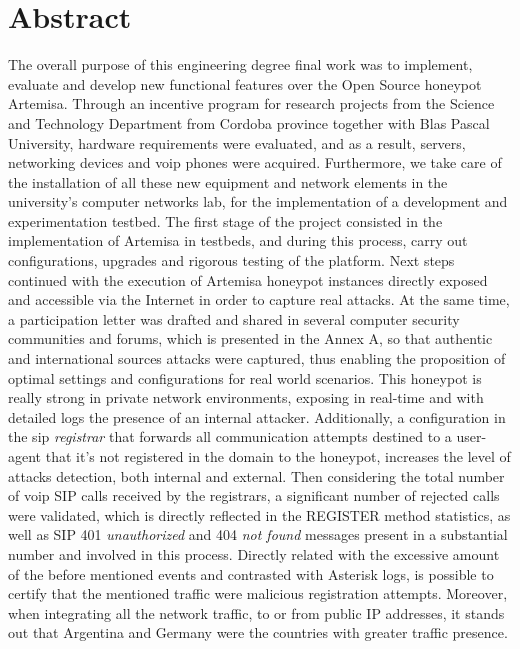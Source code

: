\documentclass[a4paper,12pt]{report}
\begin{document}
\chapter*{Abstract}
The overall purpose of this engineering degree final work was to implement, evaluate and develop 
new functional features over the Open Source honeypot Artemisa. Through an \mbox{incentive} program for
research projects from the Science and Technology Department from Cordoba province together with 
Blas Pascal University, hardware requirements were evaluated, and as a result, servers, networking 
devices and \ac{voip} phones were acquired. Furthermore, we take care of the installation of all 
these new equipment and network elements in the university's \mbox{computer} networks lab, for the 
implementation of a development and experimentation testbed. The first stage of the project consisted 
in the implementation of Artemisa in testbeds, and \mbox{during} this process, carry out configurations,
upgrades and rigorous testing of the platform. Next steps continued with the execution of Artemisa
honeypot instances directly exposed  and accessible via the Internet in order to capture real attacks.
At the same time, a participation letter was drafted and shared in several computer security communities
and forums, which is presented in the Annex A, so that authentic and international sources attacks were
captured, thus enabling the proposition of
optimal settings and configurations for real world scenarios. This honeypot is really strong in private
network environments, exposing in real-time and with detailed logs the presence of an internal attacker.
Additionally, a configuration in the \ac{sip} \emph{registrar} that forwards all communication attempts
destined to a user-agent that it's not registered in the domain to the honeypot, increases the level of
attacks detection, both internal and external. Then considering the total number of \ac{voip} SIP calls
received by the registrars, a significant number of rejected calls were validated, which is directly
reflected in the REGISTER method statistics, as well as SIP 401 \emph{unauthorized} and 
404 \emph{not found} messages present in a 
substantial number and involved in this process. Directly related with the excessive amount of the before 
mentioned events and contrasted with Asterisk logs, is possible to certify that the mentioned traffic were
malicious registration attempts. Moreover, when integrating all the network traffic, to or from public IP 
addresses, it stands out that Argentina and Germany were the countries with greater traffic presence.
\end{document}
